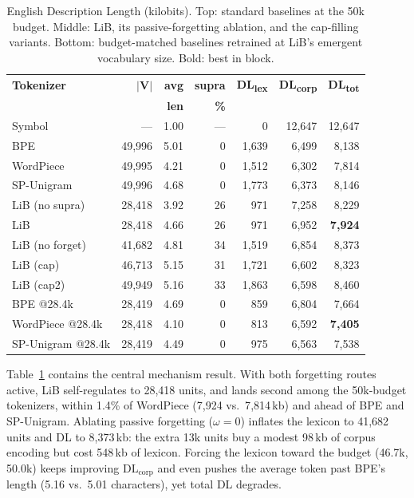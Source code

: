\documentclass[pdflatex,sn-apa]{sn-jnl}
\begin{document}
\begin{table}[t]
\centering
\small
\begin{tabular}{lrrrrrr}
\toprule
\textbf{Tokenizer} & $\mathbf{|V|}$ & \textbf{avg} & \textbf{supra} &
\textbf{DL\textsubscript{lex}} & \textbf{DL\textsubscript{corp}} & \textbf{DL\textsubscript{tot}} \\
& & \textbf{len} & \textbf{\%} & & & \\
\midrule
Symbol           &    —   & 1.00 &  — &     0 & 12,647 & 12,647 \\
BPE              & 49,996 & 5.01 &  0 & 1,639 &  6,499 &  8,138 \\
WordPiece        & 49,995 & 4.21 &  0 & 1,512 &  6,302 &  7,814 \\
SP-Unigram       & 49,996 & 4.68 &  0 & 1,773 &  6,373 &  8,146 \\
\midrule
LiB (no supra)   & 28,418 & 3.92 & 26 &   971 &  7,258 &  8,229 \\
LiB              & 28,418 & 4.66 & 26 &   971 &  6,952 &  \textbf{7,924} \\
LiB (no forget)  & 41,682 & 4.81 & 34 & 1,519 &  6,854 &  8,373 \\
LiB (cap)        & 46,713 & 5.15 & 31 & 1,721 &  6,602 &  8,323 \\
LiB (cap2)       & 49,949 & 5.16 & 33 & 1,863 &  6,598 &  8,460 \\
\midrule
BPE @28.4k       & 28,419 & 4.69 &  0 &   859 &  6,804 &  7,664 \\
WordPiece @28.4k & 28,418 & 4.10 &  0 &   813 &  6,592 &  \textbf{7,405} \\
SP-Unigram @28.4k& 28,419 & 4.49 &  0 &   975 &  6,563 &  7,538 \\
\bottomrule
\end{tabular}
\caption{English Description Length (kilobits). Top: standard baselines at
the 50k budget. Middle: LiB, its passive-forgetting ablation, and the
cap-filling variants. Bottom: budget-matched baselines retrained at LiB's
emergent vocabulary size. Bold: best in block.}
\label{tab:dl_en}
\end{table}

Table~\ref{tab:dl_en} contains the central mechanism result.
With both forgetting routes active, LiB self-regulates to 28{,}418 units,
and lands second among the 50k-budget tokenizers,
within 1.4\% of WordPiece (7{,}924 vs.\ 7{,}814\,kb) and ahead of BPE and
SP-Unigram.%
Ablating passive forgetting ($\omega{=}0$) inflates the lexicon to 41{,}682
units and DL to 8{,}373\,kb: the extra 13k units buy a modest 98\,kb of
corpus encoding but cost 548\,kb of lexicon. %
Forcing the lexicon toward the
budget (46.7k, 50.0k) keeps improving $\mathrm{DL}_\mathrm{corp}$ and even
pushes the average token past BPE's length (5.16 vs.\ 5.01 characters), yet
total DL degrades.
\end{document}
